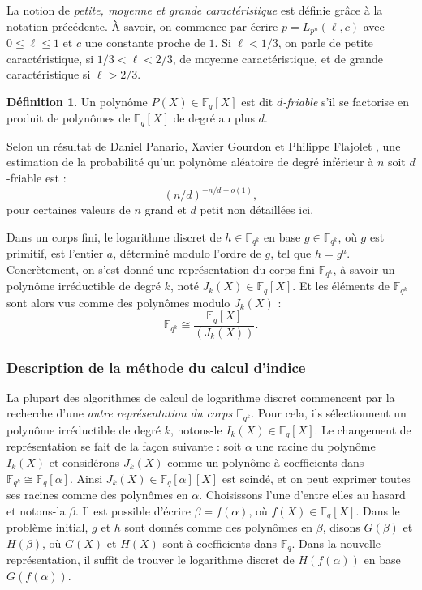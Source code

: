 \documentclass[a4paper, titlepage, 11pt]{article}
\theoremstyle{definition}
\newtheorem{defi}[theo]{Définition}
\theoremstyle{remark}
\def\o{o}
\def\gf #1{\mathbb{F}_{#1}}
\begin{document}
La notion de \textit{petite, moyenne et grande caractéristique} est définie grâce à la notation précédente. À savoir, on commence par écrire $p = L_{p^n}(\ell,c)$ avec $0\leqslant\ell\leqslant 1$ et $c$ une constante proche de $1$. Si $\ell < 1/3$, on parle de petite caractéristique, si $1/3 < \ell < 2/3$, de moyenne caractéristique, et de grande caractéristique si $\ell > 2/3$.

\begin{defi}
Un polynôme $P(X) \in \gf{q}[X]$ est dit \textit{$d$-friable} s'il se factorise en produit de polynômes de $\gf{q}[X]$ de degré au plus $d$.
\end{defi}

Selon un résultat de Daniel Panario, Xavier Gourdon et Philippe Flajolet \cite{PGF98}, une estimation de la probabilité qu'un polynôme aléatoire de degré inférieur à $n$ soit $d$-friable est :
$${(n/d)}^{-n/d + \o(1)},$$
pour certaines valeurs de $n$ grand et $d$ petit non détaillées ici.

Dans un corps fini, le logarithme discret de $h \in \gf{q^k}$ en base $g \in \gf{q^k}$, où $g$ est primitif, est l'entier $a$, déterminé modulo l'ordre de $g$, tel que $h = g^a$. Concrètement, on s'est donné une représentation du corps fini $\gf{q^k}$, à savoir un polynôme irréductible de degré $k$, noté $J_k(X) \in \gf{q}[X]$. Et les éléments de $\gf{q^k}$ sont alors vus comme des polynômes modulo $J_k(X)$ :
$$\gf{q^k} \cong \frac{\gf{q}[X]}{(J_k(X))}.$$

\subsubsection{Description de la méthode du calcul d'indice}
La plupart des algorithmes de calcul de logarithme discret commencent par la recherche d'une \textit{autre représentation du corps $\gf{q^k}$}. Pour cela, ils sélectionnent un polynôme irréductible de degré $k$, notons-le $I_k(X) \in \gf{q}[X]$. Le changement de représentation se fait de la façon suivante : soit $\alpha$ une racine du polynôme $I_k(X)$ et considérons $J_k(X)$ comme un polynôme à coefficients dans $\gf{q^k} \cong \gf{q}[\alpha]$. Ainsi $J_k(X) \in \gf{q}[\alpha][X]$ est scindé, et on peut exprimer toutes ses racines comme des polynômes en $\alpha$. Choisissons l'une d'entre elles au hasard et notons-la $\beta$. Il est possible d'écrire $\beta = f(\alpha)$, où $f(X) \in \gf{q}[X]$. Dans le problème initial, $g$ et $h$ sont donnés comme des polynômes en $\beta$, disons $G(\beta)$ et $H(\beta)$, où $G(X)$ et $H(X)$ sont à coefficients dans $\gf{q}$. Dans la nouvelle représentation, il suffit de trouver le logarithme discret de $H(f(\alpha))$ en base $G(f(\alpha))$.
\end{document}
